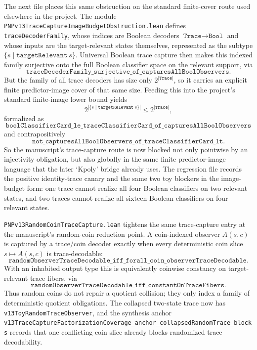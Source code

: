\documentclass[11pt]{article}
\theoremstyle{remark}
\begin{document}
The next file places this same obstruction on the standard finite-cover route
used elsewhere in the project.  The module
\texttt{PNPv13TraceCaptureImageBudgetObstruction.lean} defines
\texttt{traceDecoderFamily}, whose indices are Boolean decoders
\(\texttt{Trace} \to \texttt{Bool}\) and whose inputs are the target-relevant
states themselves, represented as the subtype
\(\{s \mid \texttt{targetRelevant}\ s\}\).  Universal Boolean trace capture
then makes this indexed family surjective onto the full Boolean classifier
space on the relevant support, via
\[
  \texttt{traceDecoderFamily\_surjective\_of\_capturesAllBoolObservers}.
\]
But the family of all trace decoders has size only \(2^{|\texttt{Trace}|}\), so
it carries an explicit finite predictor-image cover of that same size.  Feeding
this into the project's standard finite-image lower bound yields
\[
  2^{|\{s \mid \texttt{targetRelevant}\ s\}|} \le 2^{|\texttt{Trace}|},
\]
formalized as
\[
  \texttt{boolClassifierCard\_le\_traceClassifierCard\_of\_capturesAllBoolObservers}
\]
and contrapositively
\[
  \texttt{not\_capturesAllBoolObservers\_of\_traceClassifierCard\_lt}.
\]
So the manuscript's trace-capture route is now blocked not only pointwise by
an injectivity obligation, but also globally in the same finite predictor-image
language that the later `Kpoly' bridge already uses.  The regression file
records the positive identity-trace canary and the same two toy blockers in the
image-budget form: one trace cannot realize all four Boolean classifiers on two
relevant states, and two traces cannot realize all sixteen Boolean classifiers
on four relevant states.

\texttt{PNPv13RandomCoinTraceCapture.lean} tightens the same trace-capture
entry at the manuscript's random-coin reduction point.  A coin-indexed observer
\(A(s,c)\) is captured by a trace/coin decoder exactly when every deterministic
coin slice \(s\mapsto A(s,c)\) is trace-decodable:
\[
  \texttt{randomObserverTraceDecodable\_iff\_forall\_coin\_observerTraceDecodable}.
\]
With an inhabited output type this is equivalently coinwise constancy on
target-relevant trace fibers, via
\[
  \texttt{randomObserverTraceDecodable\_iff\_constantOnTraceFibers}.
\]
Thus random coins do not repair a quotient collision; they only index a family
of deterministic quotient obligations.  The collapsed two-state trace now has
\texttt{v13ToyRandomTraceObserver}, and the synthesis anchor
\texttt{v13TraceCaptureFactorizationCoverage\_anchor\_collapsedRandomTrace\_blocks}
records that one conflicting coin slice already blocks randomized trace
decodability.
\end{document}
